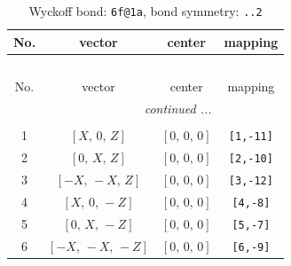 \documentclass[fleqn,8pt]{jsarticle}
\begin{document}
\begin{longtable}{cccc}
\caption{Wyckoff bond: {\tt 6f@1a}, bond symmetry: {\tt ..2}}
 \\
 \hline \hline
No. & vector & center & mapping \\ \hline \endfirsthead

\multicolumn{3}{l}{\tablename\ \thetable{}} \\
 \hline \hline
No. & vector & center & mapping \\ \hline \endhead

 \hline \hline
\multicolumn{3}{r}{\footnotesize\it continued ...} \\ \endfoot

 \hline \hline
\multicolumn{3}{r}{} \\ \endlastfoot

1 & $\left[ X,\, 0,\, Z \right]$ & $\left[ 0,\, 0,\, 0 \right]$ & {\tt [1,-11]} \\ \hline
2 & $\left[ 0,\, X,\, Z \right]$ & $\left[ 0,\, 0,\, 0 \right]$ & {\tt [2,-10]} \\ \hline
3 & $\left[ - X,\, - X,\, Z \right]$ & $\left[ 0,\, 0,\, 0 \right]$ & {\tt [3,-12]} \\ \hline
4 & $\left[ X,\, 0,\, - Z \right]$ & $\left[ 0,\, 0,\, 0 \right]$ & {\tt [4,-8]} \\ \hline
5 & $\left[ 0,\, X,\, - Z \right]$ & $\left[ 0,\, 0,\, 0 \right]$ & {\tt [5,-7]} \\ \hline
6 & $\left[ - X,\, - X,\, - Z \right]$ & $\left[ 0,\, 0,\, 0 \right]$ & {\tt [6,-9]} \\
\end{longtable}
\renewcommand{\arraystretch}{1.2}
\end{document}
